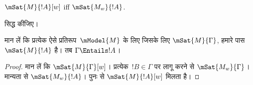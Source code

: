\documentclass[../../../include/open-logic-section]{subfiles}
\begin{document}
\begin{prop}
  $\mSat{M}{!A}[w]$ iff $\mSat{M_w}{!A}$.
\end{prop}

\begin{prob}
   सिद्ध कीजिए।
\end{prob}

\begin{prop}
  मान लें कि प्रत्येक ऐसे प्रतिरूप~$\mModel{M}$ के लिए जिसके लिए
  $\mSat{M}{\Gamma}$, हमारे पास $\mSat{M}{!A}$ है। तब
  $\Gamma \Entails !A$।
\end{prop}

\begin{proof}
  मान लें कि $\mSat{M}{\Gamma}[w]$। प्रत्येक~$!B \in \Gamma$ पर
   लागू करने से $\mSat{M_w}{\Gamma}$। मान्यता से
  $\mSat{M_w}{!A}$। पुनः  से
  $\mSat{M}{!A}[w]$ मिलता है।
\end{proof}
\end{document}
